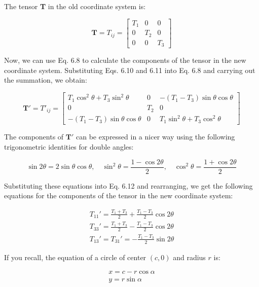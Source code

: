 \documentclass[a4paper , 12pt]{book}
\begin{document}
The tensor \textbf{T} in the old coordinate system is:

\begin{equation}
    \mathbf{T}=T_{ij}=\begin{bmatrix}T_1&0&0\\0&T_2&0\\0&0&T_3\end{bmatrix}
\end{equation}

Now, we can use Eq. 6.8 to calculate the components of the tensor in the new coordinate system. Substituting Eqs. 6.10 and 6.11 into Eq. 6.8 and carrying out the summation, we obtain:

\begin{equation}
    \mathbf{T'}=T'_{ij}=\begin{bmatrix}T_1\cos^2\theta+T_3\sin^2\theta&0&-(T_1-T_3)\sin\theta\cos\theta\\0&T_2&0\\-(T_1-T_3)\sin\theta\cos\theta&0&T_1\sin^2\theta+T_3\cos^2\theta\end{bmatrix}
\end{equation}

The components of $\mathbf{T'}$ can be expressed in a nicer way using the following trigonometric identities for double angles:

\begin{equation}
    \sin 2\theta=2\sin\theta\cos\theta,\quad \sin^2\theta=\frac{1-\cos 2\theta}{2},\quad \cos^2\theta=\frac{1+\cos 2\theta}{2}
\end{equation}

Substituting these equations into Eq. 6.12 and rearranging, we get the following equations for the components of the tensor in the new coordinate system:

\begin{equation}
    \begin{gathered}
        T_{11}'=\frac{T_1+T_3}{2}+\frac{T_1-T_3}{2}\cos 2\theta  \\
        T_{33}'=\frac{T_1+T_3}{2}-\frac{T_1-T_3}{2}\cos 2\theta \\
        T_{13}'=T_{31}'=-\frac{T_1-T_3}{2}\sin 2\theta
    \end{gathered}
\end{equation}

If you recall, the equation of a circle of center $(c,0)$ and radius $r$ is:

\begin{equation}
    \begin{gathered}
        x=c-r\cos\alpha \\
        y=r\sin\alpha
    \end{gathered}
\end{equation}
\end{document}
